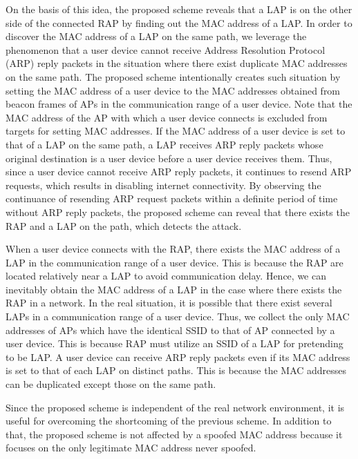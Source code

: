 \documentclass[conference]{IEEEtran}
\begin{document}
On the basis of this idea, the proposed scheme reveals that a LAP is on the other side of the connected RAP by finding out the MAC address of a LAP.
In order to discover the MAC address of a LAP on the same path, we leverage the phenomenon that a user device cannot receive Address Resolution Protocol (ARP) reply packets in the situation where there exist duplicate MAC addresses on the same path.
The proposed scheme intentionally creates such situation by setting the MAC address of a user device to the MAC addresses obtained from beacon frames of APs in the communication range of a user device.
Note that the MAC address of the AP with which a user device connects is excluded from targets for setting MAC addresses.
If the MAC address of a user device is set to that of a LAP on the same path, a LAP receives ARP reply packets whose original destination is a user device before a user device receives them.
Thus, since a user device cannot receive ARP reply packets, it continues to resend ARP requests, which results in disabling internet connectivity.
By observing the continuance of resending ARP request packets within a definite period of time without ARP reply packets, the proposed scheme can reveal that there exists the RAP and a LAP on the path, which detects the attack.

When a user device connects with the RAP, there exists the MAC address of a LAP in the communication range of a user device.
This is because the RAP are located relatively near a LAP to avoid communication delay.
Hence, we can inevitably obtain the MAC address of a LAP in the case where there exists the RAP in a network.
In the real situation, it is possible that there exist several LAPs in a communication range of a user device.
Thus, we collect the only MAC addresses of APs which have the identical SSID to that of AP connected by a user device.
This is because RAP must utilize an SSID of a LAP for pretending to be LAP.
A user device can receive ARP reply packets even if its MAC address is set to that of each LAP on distinct paths.
This is because the MAC addresses can be duplicated except those on the same path.

Since the proposed scheme is independent of the real network environment, it is useful for overcoming the shortcoming of the previous scheme.
In addition to that, the proposed scheme is not affected by a spoofed MAC address because it focuses on the only legitimate MAC address never spoofed.
\end{document}
